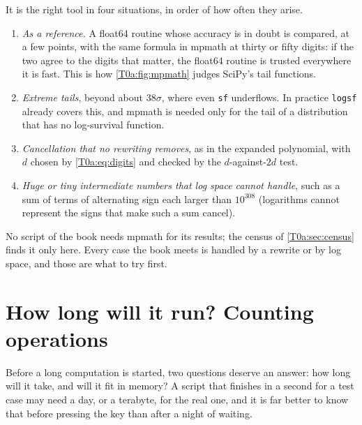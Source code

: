 It is the right tool in four situations, in order of how often they arise.
\begin{enumerate}[leftmargin=2em,itemsep=1pt]
  \item \emph{As a reference.} A float64 routine whose accuracy is in doubt is compared, at a few points, with the same formula in mpmath at thirty or fifty digits: if the two agree to the digits that matter, the float64 routine is trusted everywhere it is fast. This is how \cref{T0a:fig:mpmath} judges SciPy's tail functions.
  \item \emph{Extreme tails}, beyond about $38\sigma$, where even \texttt{sf} underflows. In practice \texttt{logsf} already covers this, and mpmath is needed only for the tail of a distribution that has no log-survival function.
  \item \emph{Cancellation that no rewriting removes}, as in the expanded polynomial, with $d$ chosen by \eqref{T0a:eq:digits} and checked by the $d$-against-$2d$ test.
  \item \emph{Huge or tiny intermediate numbers that log space cannot handle}, such as a sum of terms of alternating sign each larger than $10^{308}$ (logarithms cannot represent the signs that make such a sum cancel).
\end{enumerate}
No script of the book needs mpmath for its results; the census of \cref{T0a:sec:census} finds it only here. Every case the book meets is handled by a rewrite or by log space, and those are what to try first.
\providecommand{\TzBruteLinMin}{\pgfmathparse{62.5*\TzBruteSixteenK/60}\pgfmathprintnumber[fixed,precision=0]{\pgfmathresult}}
\providecommand{\TzBruteQuadH}{\pgfmathparse{(62.5/60)*(62.5/60)*\TzBruteSixteenK}\pgfmathprintnumber[fixed,precision=0]{\pgfmathresult}}
\providecommand{\TzCholRatio}{\pgfmathparse{\TzCholMeas/\EightACholSix}\pgfmathprintnumber[fixed,precision=1]{\pgfmathresult}}
\providecommand{\TzDaysRatio}{\pgfmathparse{\TzCholNsideDaysThree/\EightALikeDaysTwoFiveSix}\pgfmathprintnumber[fixed,precision=1]{\pgfmathresult}}
\providecommand{\TzMcMinutes}{\pgfmathparse{3000*\TzShtTwoFiveSix/60}\pgfmathprintnumber[fixed,precision=0]{\pgfmathresult}}

\section{How long will it run? Counting operations}
\label{T0a:sec:cost}

Before a long computation is started, two questions deserve an answer: how long will it take, and will it fit in memory? A script that finishes in a second for a test case may need a day, or a terabyte, for the real one, and it is far better to know that before pressing the key than after a night of waiting.

